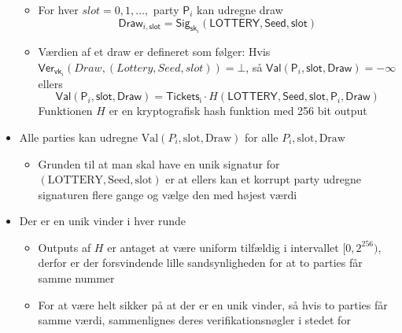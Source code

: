 \documentclass[a4, english]{article}
\begin{document}
\begin{itemize}
\begin{itemize}
    \item For hver $slot = 0,1,\dots,$ party $\mathsf{P}_i$ kan udregne draw 
    \begin{equation*}
      \mathsf{Draw}_{i,\mathsf{slot}} = \mathsf{Sig}_{\mathsf{sk}_i}(\mathsf{LOTTERY}, \mathsf{Seed}, \mathsf{slot}) 
    \end{equation*}
    \item Værdien af et draw er defineret som følger: Hvis $\mathsf{Ver}_{\mathsf{vk}_i}(Draw,(Lottery, Seed, slot)) = \bot$, så $\mathsf{Val}(\mathsf{P}_i,\mathsf{slot}, \mathsf{Draw}) = - \infty$ ellers 
    \begin{equation*}
      \mathsf{Val}(\mathsf{P}_i,\mathsf{slot}, \mathsf{Draw}) = \mathsf{Tickets_i} \cdot H(\mathsf{LOTTERY}, \mathsf{Seed}, \mathsf{slot}, \mathsf{P}_i, \mathsf{Draw})
    \end{equation*}
    Funktionen $H$ er en kryptografisk hash funktion med 256 bit output   
  \end{itemize}
  \item Alle parties kan udregne $\text{Val}(P_i, \text{slot}, \text{Draw})$ for alle $P_i,\text{slot}, \text{Draw}$
  \begin{itemize}
  	\item Grunden til at man skal have en unik signatur for $(\text{LOTTERY}, \text{Seed}, \text{slot})$ er at ellers kan et korrupt party udregne signaturen flere gange og vælge den med højest værdi
  \end{itemize}
  \item Der er en unik vinder i hver runde
  \begin{itemize}
  	\item Outputs af $H$ er antaget at være uniform tilfældig i intervallet $[0,2^{256})$, derfor er der forsvindende lille sandsynligheden for at to parties får samme nummer
    \item For at være helt sikker på at der er en unik vinder, så hvis to parties får samme værdi, sammenlignes deres verifikationsnøgler i stedet for    
  \end{itemize}
\end{itemize}
\end{document}

